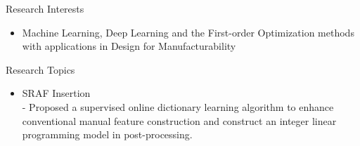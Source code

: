 
\begin{rSection}{Research Interests}
\begin{itemize}
    \item Machine Learning, Deep Learning and the First-order Optimization methods with applications in Design for Manufacturability 
\end{itemize}
\end{rSection}

\begin{rSection}{Research Topics}
	\begin{itemize}
		\item SRAF Insertion  \\%
		 - Proposed a supervised online dictionary learning algorithm to enhance conventional manual feature construction and construct an integer linear programming model in post-processing. 
	\end{itemize}
\end{rSection}
\iffalse
\begin{rSection}{Teaching Interests}
\begin{itemize}
    \item \textbf{Undergraduate}: VLSI design, logic design, computer architecture, programming, algorithms and data structures.
    \item \textbf{Graduate}: Advanced VLSI design and CAD, VLSI physical design, VLSI manufacturability/reliability optimization, Advanced algorithms and combinatorial optimization.
\end{itemize}
\end{rSection}
\fi


